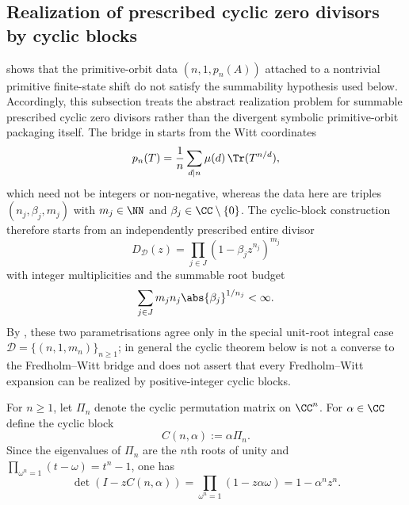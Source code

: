 
\subsection{Realization of prescribed cyclic zero divisors by cyclic blocks}

 shows that the primitive-orbit
data \((n,1,p_n(A))\) attached to a nontrivial primitive finite-state
shift do not satisfy the summability hypothesis used below. Accordingly,
this subsection treats the abstract realization problem for summable
prescribed cyclic zero divisors rather than the divergent symbolic
primitive-orbit packaging itself.
The bridge in  starts from the Witt
coordinates
\[
  p_n(T)=\frac{1}{n}\sum_{d\mid n}\mu(d)\,\Tr(T^{n/d}),
\]
which need not be integers or non-negative, whereas the data here are
triples \((n_j,\beta_j,m_j)\) with \(m_j\in\NN\) and
\(\beta_j\in\CC\setminus\{0\}\). The cyclic-block construction therefore
starts from an independently prescribed entire divisor
\[
  D_{\mathcal D}(z)=\prod_{j\in J}(1-\beta_j z^{n_j})^{m_j}
\]
with integer multiplicities and the summable root budget
\[
  \sum_{j\in J}m_j n_j\abs{\beta_j}^{1/n_j}<\infty.
\]
By
, these two parametrisations agree
only in the special unit-root integral case
\(\mathcal D=\{(n,1,m_n)\}_{n\ge1}\); in general the cyclic theorem below
is not a converse to the Fredholm--Witt bridge and does not assert that
every Fredholm--Witt expansion can be realized by positive-integer cyclic
blocks.

For \(n\ge 1\), let \(\Pi_n\) denote the cyclic permutation matrix on
\(\CC^n\). For \(\alpha\in\CC\) define the cyclic block
\[
  C(n,\alpha):=\alpha\Pi_n.
\]
Since the eigenvalues of \(\Pi_n\) are the \(n\)th roots of unity and
\(\prod_{\omega^n=1}(t-\omega)=t^n-1\), one has
\begin{equation}\label{eq:cycle-block-det}
  \det(I-zC(n,\alpha))
  =\prod_{\omega^n=1}(1-z\alpha\omega)
  =1-\alpha^n z^n.
\end{equation}

